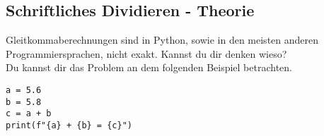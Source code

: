 \subsection{Schriftliches Dividieren - Theorie }
Gleitkommaberechnungen sind in Python, sowie in den meisten anderen Programmiersprachen, nicht exakt. Kannst du dir denken wieso?
\\Du kannst dir das Problem an dem folgenden Beispiel betrachten.
\begin{lstlisting}
a = 5.6
b = 5.8
c = a + b
print(f"{a} + {b} = {c}")
\end{lstlisting}
